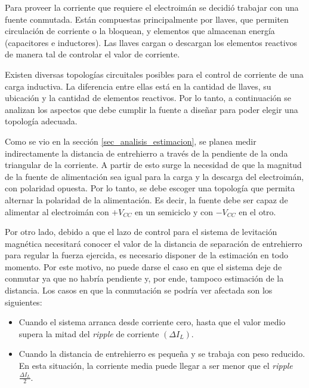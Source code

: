 
Para proveer la corriente que requiere el electroimán se decidió trabajar con una fuente conmutada. Están compuestas principalmente por llaves, que permiten circulación de corriente o la bloquean, y elementos que almacenan energía (capacitores e inductores). Las llaves cargan o descargan los elementos reactivos de manera tal de controlar el valor de corriente.

Existen diversas topologías circuitales posibles para el control de corriente de una carga inductiva. La diferencia entre ellas está en la cantidad de llaves, su ubicación y la cantidad de elementos reactivos. Por lo tanto, a continuación se analizan los aspectos que debe cumplir la fuente a diseñar para poder elegir una topología adecuada.

Como se vio en la sección \ref{sec_analisis_estimacion}, se planea medir indirectamente la distancia de entrehierro a través de la pendiente de la onda triangular de la corriente. A partir de esto surge la necesidad de que la magnitud de la fuente de alimentación sea igual para la carga y la descarga del electroimán, con polaridad opuesta. Por lo tanto, se debe escoger una topología que permita alternar la polaridad de la alimentación. Es decir, la fuente debe ser capaz de alimentar al electroimán con $+V_{CC}$  en un semiciclo y con $-V_{CC}$ en el otro.

Por otro lado, debido a que el lazo de control para el sistema de levitación magnética necesitará conocer el valor de la distancia de separación de entrehierro para regular la fuerza ejercida, es necesario disponer de la estimación en todo momento. Por este motivo, no puede darse el caso en que el sistema deje de conmutar ya que no habría pendiente y, por ende, tampoco estimación de la distancia. Los casos en que la conmutación se podría ver afectada son los siguientes: 
\begin{itemize} 
	\item Cuando el sistema arranca desde corriente cero, hasta que el valor medio supera la mitad del \textsl{ripple} de corriente $(\Delta I_{L})$.
	
	\item Cuando la distancia de entrehierro es pequeña y se trabaja con peso reducido. En esta situación, la corriente media puede llegar a ser menor que el \textsl{ripple} $\frac{\Delta I_{L}}{2}$.
\end{itemize}

